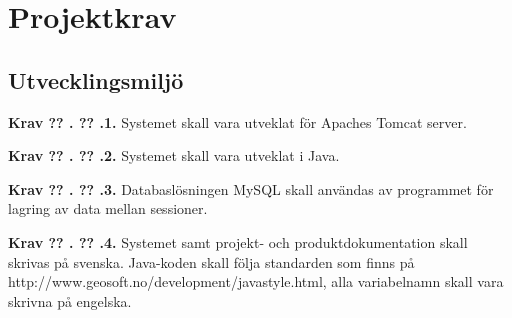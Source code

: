 \documentclass[a4paper]{article}
\newcommand\getcurrentref[1]{%
 \ifnumequal{\value{#1}}{0}
  {??}
  {\the\value{#1}}%
}
\newcommand\requirement[2]{
	\numberedrow{Krav}{#1}{#2}
}
\newcommand\numberedrow[3]{
	\noindent
	\textbf{#1 \getcurrentref{section}.\getcurrentref{subsection}.#2.} #3
	
}
\begin{document}
\section{Projektkrav}
\subsection{Utvecklingsmiljö}
\requirement{1}{Systemet skall vara utveklat för Apaches Tomcat server.}
\requirement{2}{Systemet skall vara utveklat i Java.}
\requirement{3}{Databaslösningen MySQL skall användas av programmet för lagring av data mellan sessioner.}
\requirement{4}{Systemet samt projekt- och produktdokumentation skall skrivas på svenska. Java-koden skall följa standarden som finns på http://www.geosoft.no/development/javastyle.html, alla variabelnamn skall vara skrivna på engelska.}
\end{document}
